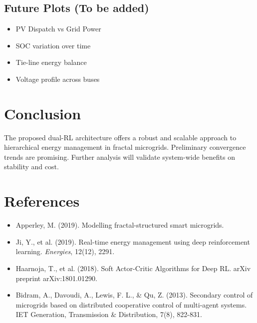 \documentclass[11pt]{article}
\begin{document}
\subsection{Future Plots (To be added)}
\begin{itemize}
  \item PV Dispatch vs Grid Power
  \item SOC variation over time
  \item Tie-line energy balance
  \item Voltage profile across buses
\end{itemize}

\section{Conclusion}
The proposed dual-RL architecture offers a robust and scalable approach to hierarchical energy management in fractal microgrids. Preliminary convergence trends are promising. Further analysis will validate system-wide benefits on stability and cost.

\section*{References}
\begin{itemize}
  \item Apperley, M. (2019). Modelling fractal-structured smart microgrids.
  \item Ji, Y., et al. (2019). Real-time energy management using deep reinforcement learning. \textit{Energies}, 12(12), 2291.
  \item Haarnoja, T., et al. (2018). Soft Actor-Critic Algorithms for Deep RL. arXiv preprint arXiv:1801.01290.
  \item Bidram, A., Davoudi, A., Lewis, F. L., & Qu, Z. (2013). Secondary control of microgrids based on distributed cooperative control of multi‐agent systems. IET Generation, Transmission & Distribution, 7(8), 822-831.
\end{itemize}
\end{document}
